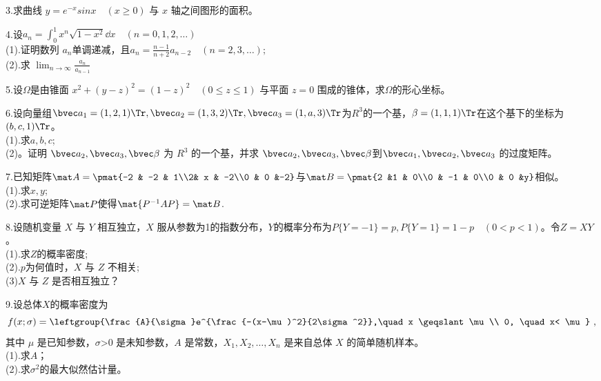 3.求曲线 $y=e^{-x}sinx \quad (x\geqslant 0)$ 与 $x$ 轴之间图形的面积。

4.设$a_n=\int_0^1 x^n \sqrt{1-x^2}\dd{x}\quad (n=0,1,2,\dots)$\\
(1).证明数列 ${a_n}$单调递减，且$\displaystyle a_n=\frac{n-1}{n+2}a_{n-2}\quad (n=2,3,\dots);$\\
(2).求 $\displaystyle \lim_{n \to \infty}\frac{a_n}{a_{n-1}}$

5.设$\Omega$是由锥面 $x^2+(y-z)^2=(1-z)^2 \quad (0\leqslant z \leqslant 1)$ 与平面 $z=0$ 围成的锥体，求$\Omega$的形心坐标。

6.设向量组$\bvec a_1=(1,2,1) \Tr,\bvec a_2=(1,3,2) \Tr,\bvec a_3=(1,a,3) \Tr$为$R^3$的一个基，$\beta=(1,1,1)\Tr$在这个基下的坐标为$(b,c,1) \Tr$。\\
(1).求$a,b,c$;\\
(2)。证明 $\bvec a_2,\bvec a_3,\bvec \beta$ 为 $R^3$ 的一个基，并求 $\bvec a_2,\bvec a_3,\bvec \beta$到$\bvec a_1,\bvec a_2,\bvec a_3$ 的过度矩阵。

7.已知矩阵$\mat A=\pmat{-2 & -2 & 1\\2& x & -2\\0 & 0 &-2}$与$\mat B=\pmat{2 &1 & 0\\0 & -1 & 0\\0 & 0 &y}$相似。\\
(1).求$x,y$;\\
(2).求可逆矩阵$\mat P$使得$\mat{P^{-1}AP}=\mat B$.

8.设随机变量 $X$ 与 $Y$ 相互独立，$X$ 服从参数为1的指数分布，$Y$的概率分布为$P\{Y=-1\}=p,P\{Y=1\}=1-p \quad (0<p<1)$。令$Z=XY$。\\
(1).求$Z$的概率密度;\\
(2).$p$为何值时，$X$ 与 $Z$ 不相关;\\
(3)$X$ 与 $Z$ 是否相互独立？

9.设总体$X$的概率密度为
$$
f(x;\sigma)=\leftgroup{\frac{A}{\sigma}e^{\frac{-(x-\mu)^2}{2\sigma^2}},\quad  x \geqslant \mu\\ 0, \quad  x< \mu}~,
$$
其中 $\mu$ 是已知参数，$\sigma$>0 是未知参数，$A$ 是常数，$X_1,X_2,\dots,X_n$ 是来自总体 $X$ 的简单随机样本。\\
(1).求$A$；\\
(2).求$\sigma^2$的最大似然估计量。